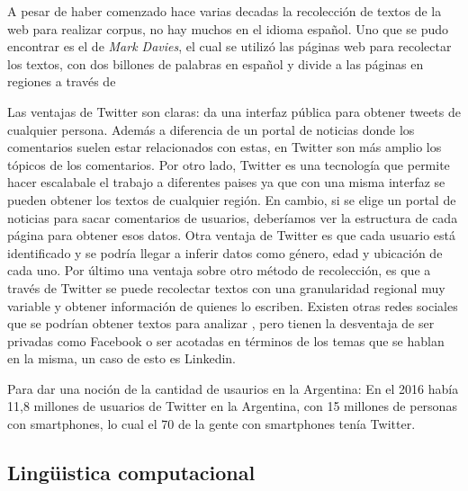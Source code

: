 A pesar de haber comenzado hace varias decadas la recolección de textos de la web para realizar corpus, no hay muchos en el idioma español.
Uno que se pudo encontrar es el de \textit{Mark Davies}, el cual se utilizó las páginas web para recolectar los textos, con dos billones de palabras en español y divide a las páginas en regiones a través de  

Las ventajas de Twitter son claras: da una interfaz pública para obtener tweets de cualquier persona. Además a diferencia de un portal de noticias donde los comentarios suelen estar relacionados con estas, en Twitter son más amplio los tópicos de los comentarios.
Por otro lado, Twitter es una tecnología que permite hacer escalabale el trabajo a diferentes paises ya que con una misma interfaz se pueden obtener los textos de cualquier región. En cambio, si se elige un portal de noticias para sacar comentarios de usuarios, deberíamos ver la estructura de cada página para obtener esos datos.
Otra ventaja de Twitter es que cada usuario está identificado y se podría llegar a inferir datos como género, edad y ubicación de cada uno.
Por último una ventaja sobre otro método de recolección, es que a través de Twitter se puede recolectar textos con una granularidad regional muy variable y obtener información de quienes lo escriben.
Existen otras redes sociales que se podrían obtener textos para analizar , pero tienen la desventaja de ser privadas como Facebook o ser acotadas en términos de los temas que se hablan en la misma, un caso de esto es Linkedin. 

Para dar una noción de la cantidad de usaurios en la Argentina:
En el 2016 había 11,8 millones de usuarios de Twitter en la Argentina, con 15 millones de personas con smartphones, lo cual el 70 de la gente con smartphones tenía Twitter.

\subsection{Lingüistica computacional} %
\label{sub:linguistica_computacional}

